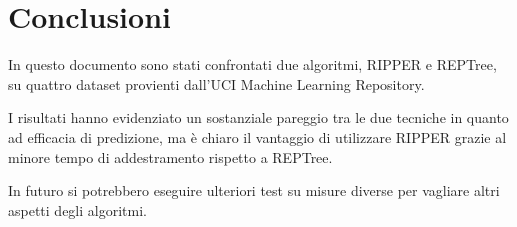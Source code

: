 \chapter{Conclusioni}

In questo documento sono stati confrontati due algoritmi, RIPPER e REPTree, su quattro dataset provienti dall'UCI Machine Learning Repository.

I risultati hanno evidenziato un sostanziale pareggio tra le due tecniche in quanto ad efficacia di predizione, ma è chiaro il vantaggio di utilizzare RIPPER grazie al minore tempo di addestramento rispetto a REPTree.

In futuro si potrebbero eseguire ulteriori test su misure diverse per vagliare altri aspetti degli algoritmi.